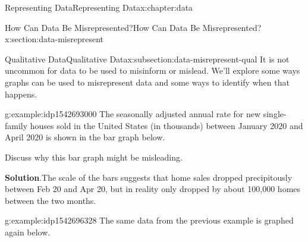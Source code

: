 \documentclass[oneside,10pt,]{book}
\newcommand{\blocktitlefont}{\relax}
\begin{document}
\begin{chapterptx}{Representing Data}{}{Representing Data}{}{}{x:chapter:data}
\typeout{************************************************}
%
\begin{sectionptx}{How Can Data Be Misrepresented?}{}{How Can Data Be Misrepresented?}{}{}{x:section:data-misrepresent}
%
%
\typeout{************************************************}
\typeout{************************************************}
%
\begin{subsectionptx}{Qualitative Data}{}{Qualitative Data}{}{}{x:subsection:data-misrepresent-qual}
It is not uncommon for data to be used to misinform or mislead.  We'll explore some ways graphs can be used to misrepresent data and some ways to identify when that happens.%
\begin{example}{}{g:example:idp1542693000}%
The seasonally adjusted annual rate for new single-family houses sold in the United States (in thousands) between January 2020 and April 2020 is shown in the bar graph below.%
\par
\begin{image}{0}{1}{0}%
%
\end{image}%
%
\par
Discuss why this bar graph might be misleading.%
\par\smallskip%
\noindent\textbf{\blocktitlefont Solution}.\hypertarget{g:solution:idp1542697480}{}\quad{}The scale of the bars suggests that home sales dropped precipitously between Feb 20 and Apr 20, but in reality only dropped by about 100,000 homes between the two months.%
\end{example}
\begin{example}{}{g:example:idp1542696328}%
The same data from the previous example is graphed again below.%
\par
\begin{image}{0}{1}{0}%
\resizebox{\linewidth}{!}{%
\begin{tikzpicture}
    \begin{axis}[
        title = New Single-Family Houses Sold Jan-Apr 2020 (thousands),

\end{axis}
\end{tikzpicture}}
\end{image}
\end{example}
\end{subsectionptx}
\end{sectionptx}
\end{chapterptx}
\end{document}
